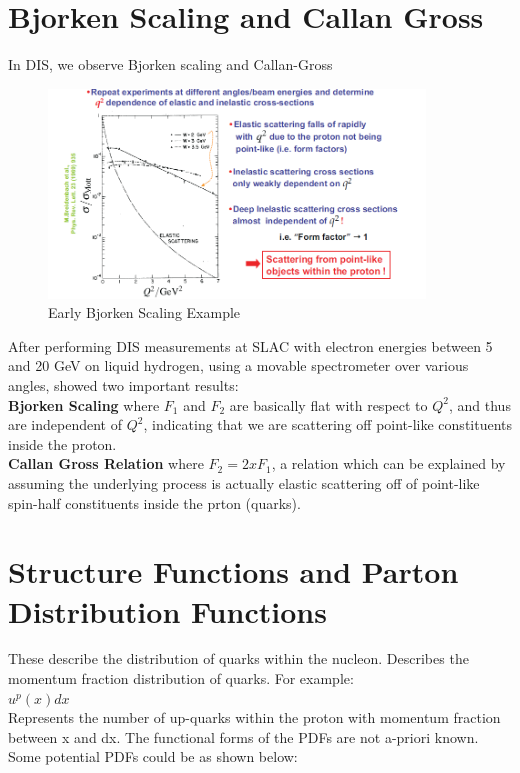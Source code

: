    \section{Bjorken Scaling and Callan Gross}
        \indent In DIS, we observe Bjorken scaling and Callan-Gross
        
        \begin{figure}[H]
            \centering
            \includegraphics[width=10cm]{NuclearPhysics/modules/lepton-scattering/pics/inelastic-ep/DIS.png}
            \caption{Early Bjorken Scaling Example}
        \end{figure}
        
        After performing DIS measurements at SLAC with electron energies between 5 and 20 GeV on liquid hydrogen, using a movable spectrometer over various angles, showed two important results:\\
        \newline
        \textbf{Bjorken Scaling} where $F_1$ and $F_2$ are basically flat with respect to $Q^2$, and thus are independent of $Q^2$, indicating that we are scattering off point-like constituents inside the proton.\\
        \newline
        \textbf{Callan Gross Relation} where $F_2 = 2x F_1$, a relation which can be explained by assuming the underlying process is actually elastic scattering off of point-like spin-half constituents inside the prton (quarks). 
    \section{Structure Functions and Parton Distribution Functions}
        \indent These describe the distribution of quarks within the nucleon. Describes the momentum fraction distribution of quarks. For example:\\
        \newline
        $u^p(x)dx$\\
        \newline
        Represents the number of up-quarks within the proton with momentum fraction between x and dx. The functional forms of the PDFs are not a-priori known. Some potential PDFs could be as shown below:\\
        
